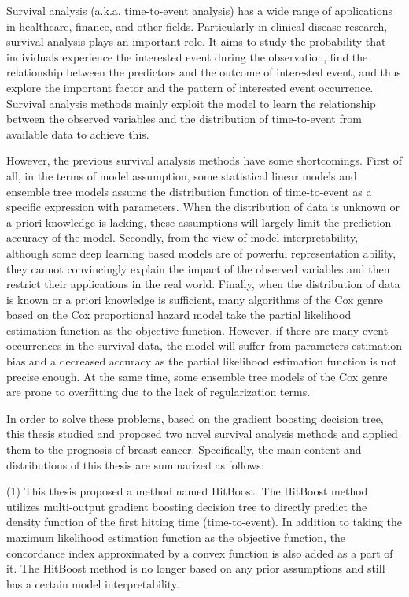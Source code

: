 
\begin{englishabstract}
    Survival analysis (a.k.a. time-to-event analysis) has a wide range of applications in healthcare, finance, and other fields. Particularly in clinical disease research, survival analysis plays an important role. It aims to study the probability that individuals experience the interested event during the observation, find the relationship between the predictors and the outcome of interested event, and thus explore the important factor and the pattern of interested event occurrence. Survival analysis methods mainly exploit the model to learn the relationship between the observed variables and the distribution of time-to-event from available data to achieve this.
	
	However, the previous survival analysis methods have some shortcomings. First of all, in the terms of model assumption, some statistical linear models and ensemble tree models assume the distribution function of time-to-event as a specific expression with parameters. When the distribution of data is unknown or a priori knowledge is lacking, these assumptions will largely limit the prediction accuracy of the model. Secondly, from the view of model interpretability, although some deep learning based models are of powerful representation ability, they cannot convincingly explain the impact of the observed variables and then restrict their applications in the real world. Finally, when the distribution of data is known or a priori knowledge is sufficient, many algorithms of the Cox genre based on the Cox proportional hazard model take the partial likelihood estimation function as the objective function. However, if there are many event occurrences in the survival data, the model will suffer from parameters estimation bias and a decreased accuracy as the partial likelihood estimation function is not precise enough. At the same time, some ensemble tree models of the Cox genre are prone to overfitting due to the lack of regularization terms.

    In order to solve these problems, based on the gradient boosting decision tree, this thesis studied and proposed two novel survival analysis methods and applied them to the prognosis of breast cancer. Specifically, the main content and distributions of this thesis are summarized as follows:

    (1) This thesis proposed a method named HitBoost. The HitBoost method utilizes multi-output gradient boosting decision tree to directly predict the density function of the first hitting time (time-to-event). In addition to taking the maximum likelihood estimation function as the objective function, the concordance index approximated by a convex function is also added as a part of it. The HitBoost method is no longer based on any prior assumptions and still has a certain model interpretability.
    

\end{englishabstract}
